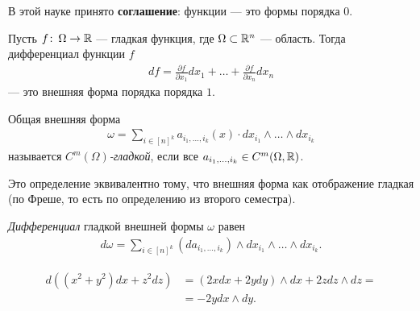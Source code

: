 В этой науке принято \textbf{соглашение}: функции --- это формы порядка $0$.

\begin{exmpl}
 Пусть $f \colon\, \Omega \to \mathbb{R}  $  --- гладкая функция, где $\Omega \subset \mathbb{R}^{n}$ --- область. Тогда дифференциал функции $f$
 \begin{align*}
  df = \frac{\partial f}{\partial x_1} dx_1 + \ldots + \frac{\partial f}{\partial x_n} dx_n
 \end{align*} --- это внешняя форма порядка порядка $1$.
\end{exmpl}
\begin{df}
 Общая внешняя форма 
\begin{align*}
 \omega = \sum_{i \in [n]^{k}} a_{i_1,\ldots,i_k}(x) \cdot dx_{i_1} \land \ldots \land dx_{i_k}
\end{align*} называется \textit{$C^{m}(\Omega)$-гладкой}, если все $a_{i_1, \ldots, i_k} \in C^{m}(\Omega, \mathbb{R})$.

Это определение эквивалентно тому, что внешняя форма как отображение гладкая (по Фреше, то есть по определению из второго семестра).
\end{df}
\begin{df}
 \textit{Дифференциал} гладкой внешней формы $\omega$ равен
 \begin{align*}
   d \omega = \sum_{i \in [n]^{k}} (d a_{i_1,\ldots,i_k}) \land dx_{i_1} \land \ldots \land dx_{i_k}
 .\end{align*} 
\end{df}
\begin{exmpl*}
 \begin{align*}
  d((x^{2} + y^{2})dx + z^{2}dz) &= (2x dx + 2y dy) \land dx + 2z dz \land dz = \\
  &= -2y dx \land dy
 .\end{align*} 
\end{exmpl*}

